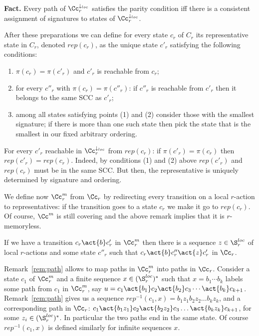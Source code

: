 \documentclass[10pt,a4paper]{article}
\newcommand{\Ccloc}{\Cc^{\dar_{loc}}}
\newcommand{\rep}{\mathit{rep}}
\newcommand{\mem}[1]{#1^m}
\newcommand{\Sloc}{\S^{loc}}
\newcommand{\dar}{\downarrow}
\begin{document}
 \noindent
\textbf{Fact.} 
 Every path of $\Ccloc_r$ satisfies the parity
  condition iff there is a consistent assignment of signatures to
  states of $\Ccloc_r$.


  After these preparations we can define for every state $c_r$ of
  $C_r$ its
  representative state in $C_r$, denoted $\rep(c_r)$, as the unique
  state $c'_r$ satisfying the following conditions:
  \begin{enumerate}
\item $\pi(c_r) = \pi(c'_r)$ and $c'_r$ is reachable from $c_r$;
\item for every $c''_r$ with $\pi(c_r)=\pi(c''_r)$: if $c''_r$ is
  reachable from $c'_r$ then it belongs to the same SCC as
  $c'_r$;
\item among all states satisfying points (1) and (2) consider those
  with the smallest signature; if there is more than one such state
  then pick the state that is the smallest in our fixed arbitrary ordering.
\end{enumerate}


  \begin{remark}\label{rem:rep} 
    For every $c'_r$ reachable in $\Ccloc_r$ from $\rep(c_r)$: if
    $\pi(c'_r)=\pi(c_r)$ then $\rep(c'_r)=\rep(c_r)$. Indeed, by
    conditions (1) and (2) above $\rep(c'_r)$ and $\rep(c_r)$ must be
    in the same SCC. But then, the representative is uniquely
    determined by signature and ordering. 
  \end{remark}
  

  We define now $\mem\Cc_r$ from $\Cc_r$ by redirecting every
  transition on a local $r$-action to representatives: if the transition
  goes to a state $c_r$ we make it go to $\rep(c_r)$. Of course,
  $\mem\Cc$ is still covering and
  the above remark implies that it is $r$-memoryless.


  \begin{remark}\label{rem:path}
    If we have a transition $c_r\act{b} c'_r$ in $\mem\Cc_r$ then
    there is a sequence $z \in \S^{loc}_r$ of local $r$-actions and
    some state $c''_r$ such that
    $c_r\act{b} c''_r\act{z} c'_r$ in $\Cc_r$.
  \end{remark}
 

  Remark~\ref{rem:path} allows to map paths in $\mem\Cc_r$ into paths
  in $\Cc_r$. Consider a state $c_1$ of $\mem\Cc_r$ and a finite
  sequence $x\in(\Sloc_r)^*$ such that $x=b_1\cdots b_k$ labels some path
  from $c_1$ in $\mem\Cc_r$, say $u=c_1\act{b_1} c_2\act{b_2}
  c_3\cdots \act{b_k}c_{k+1}$. Remark~\ref{rem:path} gives us a
  sequence $\rep^{-1}(c_1,x)=b_1z_1b_2z_2\dots b_kz_k$, and a
  corresponding path in $\Cc_r$: $c_1\act{b_1z_1}
  c_2\act{b_2z_2}c_3\dots \act{b_kz_k} c_{k+1}$, for some $z_i\in
  (\Sloc_r)^*$. In particular the two paths end in the same state. Of
  course $\rep^{-1}(c_1,x)$ is defined similarly for infinite
  sequences $x$.
\end{document}
